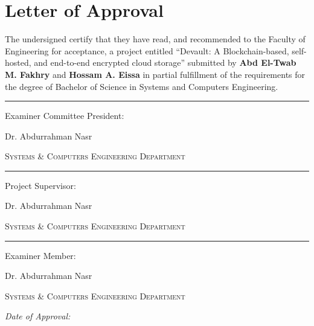 
\chapter*{Letter of Approval}

The undersigned certify that they have read, and recommended to the Faculty of Engineering for acceptance, a project entitled ``Devault: A Blockchain-based, self-hosted, and end-to-end encrypted cloud storage'' submitted by \textbf{Abd El-Twab M. Fakhry} and \textbf{Hossam A. Eissa} in partial fulfillment of the requirements for the degree of Bachelor of Science in Systems and Computers Engineering.\vspace{2cm}


\begin{center}
  \par\noindent\rule{0.50\textwidth}{0.4pt}\par
  \footnotesize
  Examiner Committee President:\par\vspace{4pt}
  \normalsize
  Dr. Abdurrahman Nasr\par\vspace{4pt}
  \footnotesize
  \scshape
  Systems \& Computers Engineering Department\par
\end{center}\vspace{16pt}
\begin{multicols}{2}
  \begin{center}
    \par\noindent\rule{0.40\textwidth}{0.4pt}\par
    \footnotesize
    Project Supervisor:\par\vspace{4pt}
    \normalsize
    Dr. Abdurrahman Nasr\par\vspace{4pt}
    \footnotesize
    \scshape
    Systems \& Computers Engineering Department\par
  \end{center}
  \begin{center}
    \par\noindent\rule{0.40\textwidth}{0.4pt}\par
    \footnotesize
    Examiner Member:\par\vspace{4pt}
    \normalsize
    Dr. Abdurrahman Nasr\par\vspace{4pt}
    \footnotesize
    \scshape
    Systems \& Computers Engineering Department\par
  \end{center}
\end{multicols}\vspace{2cm}
{
  \Large
  \textsl{Date of Approval:}
}
